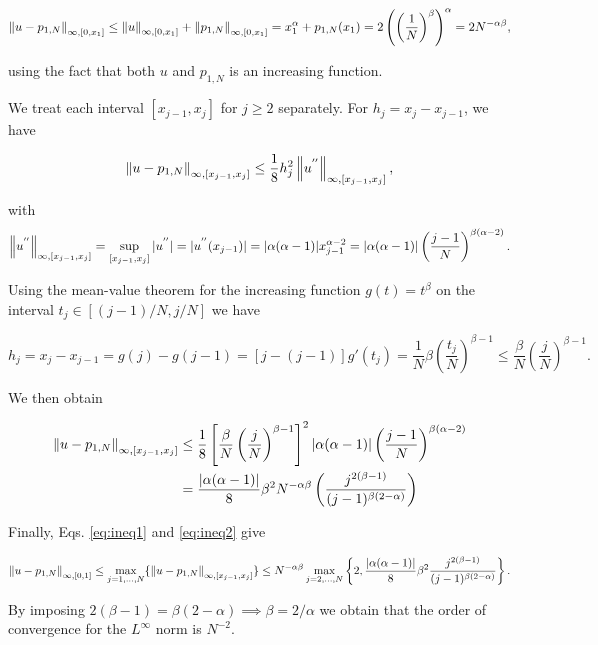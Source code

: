 \documentclass[a4paper,11pt]{article}
\begin{document}
{\begin{equation}
\label{eq:ineq1}
\left\|u - p_{1,N}\right\|_{\infty,[0,x_{1}]} \leq \left\|u\right\|_{\infty,[0,x_{1}]} + \left\|p_{1,N}\right\|_{\infty,[0,x_{1}]} = x_{1}^{\alpha} + p_{1,N}(x_{1}) = 2\left( \left(\frac{1}{N}\right)^{\beta}\right)^{\alpha} = 2N^{- \alpha \beta },  
\end{equation}

using the fact that both $u$ and $p_{1,N}$ is an increasing function.

We treat each interval $[x_{j-1},x_{j}]$ for $j \geq 2$ separately. For $h_{j} = x_{j} - x_{j-1}$, we have

$$\left\|u - p_{1,N}\right\|_{\infty,[x_{j-1},x_{j}]} \leq \frac{1}{8} h_{j}^{2} \left\|u^{''}\right\|_{\infty,[x_{j-1},x_{j}]}, $$


with $$ \left\|u^{''}\right\|_{\infty,[x_{j-1},x_{j}]} = \sup_{[x_{j-1},x_{j}]} |u^{''}| = |u^{''}(x_{j-1})| = |\alpha(\alpha - 1)|x_{j-1}^{\alpha -2} = |\alpha(\alpha - 1)| \left(\frac{j-1}{N}  \right)^{\beta(\alpha -2)}.$$

Using the mean-value theorem for the increasing function $g(t) = t^{\beta}$ on the interval $t_{j} \in [(j-1)/N,j/N]$ we have

$$ h_{j} = x_{j} - x_{j-1} = g(j) - g(j-1) = [j - (j-1)]g'(t_{j}) = \frac{1}{N} \beta \left(\frac{t_{j}}{N}\right)^{\beta - 1} \leq \frac{\beta}{N} \left(\frac{j}{N}\right)^{\beta - 1}.$$

We then obtain 

\begin{equation}
\label{eq:ineq2}
\begin{split}
  \left\|u - p_{1,N}\right\|_{\infty,[x_{j-1},x_{j}]} &\leq \frac{1}{8} \left[ \frac{\beta}{N} \left(\frac{j}{N}\right)^{\beta - 1} \right]^{2} |\alpha(\alpha - 1)| \left(\frac{j-1}{N}  \right)^{\beta(\alpha -2)}\\
  &=\frac{|\alpha(\alpha - 1)|}{8} \beta^{2} N^{-\alpha \beta} \left( \frac{j^{2(\beta - 1)}}{(j-1)^{\beta(2-\alpha)}}\right)
\end{split}
\end{equation}

Finally, Eqs. \eqref{eq:ineq1} and  \eqref{eq:ineq2} give

$$\left\|u - p_{1,N}\right\|_{\infty,[0,1]} \leq \max_{j=1,\dots,N} \{ \left\|u - p_{1,N}\right\|_{\infty,[x_{j-1},x_{j}]}\} \leq N^{-\alpha \beta} \max_{j=2,\dots,N} \left\{2, \frac{|\alpha(\alpha - 1)|}{8} \beta^{2} \frac{j^{2(\beta - 1)}}{(j-1)^{\beta(2-\alpha)}}\right\}.$$

By imposing $2(\beta - 1) = \beta(2-\alpha) \implies \beta = 2/\alpha $ we obtain that the order of convergence for the $L^{\infty}$ norm is $N^{-2}$.

}
\end{document}
